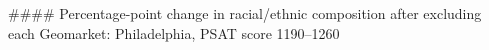#### Percentage-point change in racial/ethnic composition after excluding each Geomarket: Philadelphia, PSAT score 1190–1260
